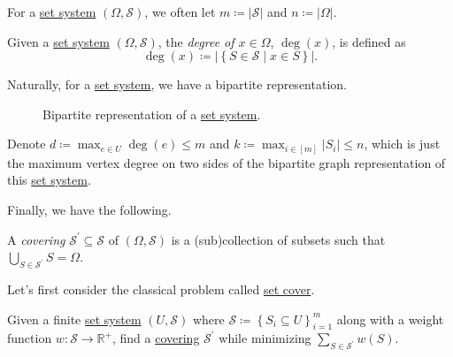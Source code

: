 \begin{note}
	For a \hyperref[def:set-system]{set system} \((\Omega , \mathcal{S} )\), we often let \(m\coloneqq \left\vert \mathcal{S}  \right\vert \) and \(n\coloneqq \left\vert \Omega  \right\vert \).
\end{note}

\begin{definition}[Degree]\label{def:degree}
	Given a \hyperref[def:set-system]{set system} \((\Omega , \mathcal{S} )\), the \emph{degree of \(x\in \Omega\)}, \(\deg(x)\), is defined as
	\[
		\deg(x) \coloneqq \left\vert \left\{ S\in \mathcal{S} \mid x\in S \right\}  \right\vert.
	\]
\end{definition}

\begin{remark}
	Naturally, for a \hyperref[def:set-system]{set system}, we have a bipartite representation.
	\begin{figure}[H]
		\centering
		\caption{Bipartite representation of a \hyperref[def:set-system]{set system}.}
		\label{fig:set-system-bip}
	\end{figure}

	Denote \(d \coloneqq \max _{e\in U}\deg(e)\leq m\) and \(k \coloneqq \max _{i\in [m]}\left\vert S_i \right\vert \leq n\), which is just the maximum vertex degree on two sides of the bipartite graph representation of this \hyperref[def:set-system]{set system}.
\end{remark}

Finally, we have the following.

\begin{definition}[Covering]\label{def:covering}
	A \emph{covering} \(\mathcal{S} ^\prime \subseteq \mathcal{S} \) of \((\Omega , \mathcal{S} )\) is a (sub)collection of subsets such that \(\bigcup_{S\in \mathcal{S} ^\prime }S = \Omega\).
\end{definition}

Let's first consider the classical problem called \hyperref[prb:set-cover]{set cover}.

\begin{problem}\label{prb:set-cover}
Given a finite \hyperref[def:set-system]{set system} \((U, \mathcal{S} )\) where \(\mathcal{S} \coloneqq \left\{ S_i\subseteq U\right\}_{i=1}^m \) along with a weight function \(w\colon \mathcal{S} \to \mathbb{R} ^+\), find a \hyperref[def:covering]{covering} \(\mathcal{S} ^\prime \) while minimizing \(\sum_{S\in \mathcal{S} ^\prime }w(S)\).
\end{problem}

